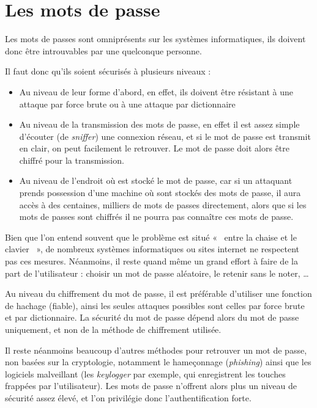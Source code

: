 \section{Les mots de passe}
Les mots de passes sont omniprésents sur les systèmes
informatiques, ils doivent donc être introuvables par une
quelconque personne.

Il faut donc qu'ils soient sécurisés à plusieurs niveaux : 
\begin{itemize}
  \item Au niveau de leur forme d'abord, en effet, ils doivent
être résistant à une attaque par force brute ou à une attaque 
par dictionnaire
  \item Au niveau de la transmission des mots de passe, en effet
il est assez simple d'écouter (de \emph{sniffer}) une connexion
réseau, et si le mot de passe est transmit en clair, on peut
facilement le retrouver. Le mot de passe doit alors être chiffré
pour la transmission.
  \item Au niveau de l'endroit où est stocké le mot de passe, car
si un attaquant prends possession d'une machine où sont stockés
des mots de passe, il aura accès à des centaines, milliers de mots
de passes directement, alors que si les mots de passes sont
chiffrés il ne pourra pas connaître ces mots de passe.
\end{itemize}

Bien que l'on entend souvent que le problème est situé «~ entre la
chaise et le clavier ~», de nombreux systèmes informatiques ou
sites internet ne respectent pas ces mesures. Néanmoins, il reste
quand même un grand effort à faire de la part de l'utilisateur :
choisir un mot de passe aléatoire, le retenir sans le noter, …

Au niveau du chiffrement du mot de passe, il est préférable
d'utiliser une fonction de hachage (fiable), ainsi les seules
attaques possibles sont celles par force brute et par
dictionnaire. La sécurité du mot de passe dépend alors du mot de
passe uniquement, et non de la méthode de chiffrement utilisée.

Il reste néanmoins beaucoup d'autres méthodes pour retrouver un mot de
passe, non basées sur la cryptologie, notamment le hameçonnage
(\emph{phishing}) ainsi que les logiciels malveillant (les
\emph{keylogger} par exemple, qui enregistrent les touches
frappées par l'utilisateur).
Les mots de passe n'offrent alors plus un niveau de sécurité assez
élevé, et l'on privilégie donc l'authentification forte.

